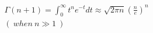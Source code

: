 \documentclass[preview]{standalone}
\begin{document}
\begin{align*}
\Gamma(n+1) = \displaystyle \int_0^{\infty}t^{n}e^{-t}dt \approx \sqrt{2\pi n}(\frac{n}{e})^n \\ ( \ when \ n \gg 1 \ )
\end{align*}
\end{document}

